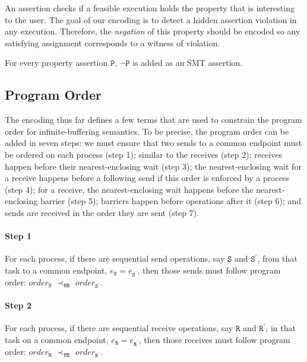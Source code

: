 An assertion checks if a feasible execution holds the property that is interesting to the user. The goal of our encoding is to detect a hidden assertion violation in any execution. Therefore, the \textit{negation} of this property should be encoded so any satisfying assignment corresponds to a witness of violation. 

\begin{definition} \label{def:assert}
For every property assertion $\mathtt{P}$, $\neg \mathtt{P}$ is added as
an SMT assertion.
\end{definition}

\subsection{Program Order}
The encoding thus far defines a few terms that are used to constrain the program order for infinite-buffering semantics. To be precise, the program order can be added in seven steps: we must ensure that two sends to a common endpoint must be ordered on each process (step 1); similar to the receives (step 2); receives happen before their nearest-enclosing wait (step 3); the nearest-enclosing wait for a receive happens before a following send if this order is enforced by a process (step 4); for a receive, the nearest-enclosing wait happens before the nearest-enclosing barrier (step 5); barriers happen before operations after it (step 6); and sends are received in the order they are sent (step 7). 

\paragraph*{Step 1} For each process, if there are sequential send
operations, say $\mathtt{S}$ and $\mathtt{S^\prime}$, from that task
to a common endpoint, $e_\mathtt{S} = e_\mathtt{S^\prime}$, then those
sends must follow program order: $\mathit{order}_\mathtt{S}$
$\prec_\mathtt{HB}$ $\mathit{order}_\mathtt{S^\prime}$.

\paragraph*{Step 2} For each process, if there are sequential receive
operations, say $\mathtt{R}$ and $\mathtt{R^\prime}$, in that task
on a common endpoint, $e_\mathtt{R} = e_\mathtt{R^\prime}$, then those
receives must follow program order: $\mathit{order}_\mathtt{R}$
$\prec_\mathtt{HB}$ $\mathit{order}_\mathtt{R^\prime}$.


